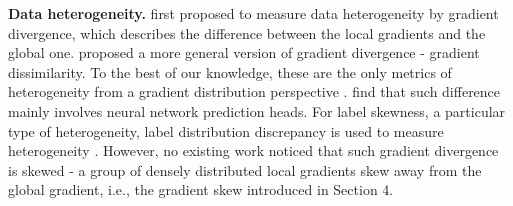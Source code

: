 \textbf{Data heterogeneity.}
\citeauthor{yu2018parallel} first proposed to measure data heterogeneity by gradient divergence, which describes the difference between the local gradients and the global one. \citeauthor{karimireddy2020scaffold} proposed a more general version of gradient divergence - gradient dissimilarity. To the best of our knowledge, these are the only metrics of heterogeneity from a gradient distribution perspective \cite{li2019convergence,woodworth2020minibatch}. \citeauthor{luo2021no} find that such difference mainly involves neural network prediction heads. For label skewness, a particular type of heterogeneity, label distribution discrepancy is used to measure heterogeneity \cite{peng2024fedcal}. However, no existing work noticed that such gradient divergence is skewed - a group of densely distributed local gradients skew away from the global gradient, i.e., the gradient skew introduced in Section 4.